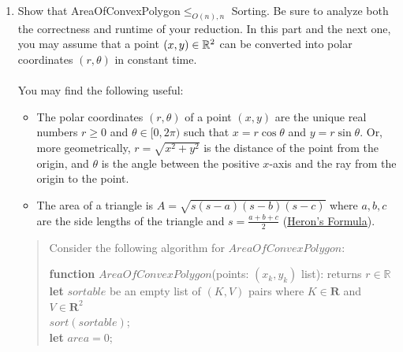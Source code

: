 \documentclass[11pt]{article}
\begin{document}
\begin{enumerate}
    \begin{enumerate}
        \item \label{part:polar} 
        Show that AreaOfConvexPolygon$\leq_{O(n),n}$ Sorting.  Be sure to analyze both the correctness and runtime of your reduction.
        In this part and the next one, you may assume that a point $(x,y)\in \mathbb{R}^2$ can be converted into polar coordinates $(r,\theta)$ in constant time. 
        \\\\
        You may find the following useful:
        \begin{itemize}
            \item The polar coordinates $(r,\theta)$ of a point $(x,y)$ are the unique real numbers $r\geq 0$ and $\theta\in [0,2\pi)$ such that $x=r\cos \theta$ and $y=r\sin \theta$. Or, more geometrically, $r=\sqrt{x^2+y^2}$ is the distance of the point from the origin, and $\theta$ is the angle between the positive $x$-axis and the ray from the origin to the point.
            \item The area of a triangle is $A = \sqrt{s(s-a)(s-b)(s-c)}$ where $a, b, c$ are the side lengths of the triangle and $s = \frac{a + b + c}{2}$ (\href{https://en.wikipedia.org/wiki/Heron\%27s_formula}{Heron's Formula}).
        \end{itemize}
        \begin{quote}
            \color{purple}
            Consider the following algorithm for $AreaOfConvexPolygon$: \newline 
           \begin{algorithm}[H]
                \textbf{function} $AreaOfConvexPolygon$(points: $(x_k, y_k)$ list): returns $r \in \mathbb{R}$\\
                {
                \textbf{let} $sortable$ be an empty list of $(K, V)$ pairs where $K \in \mathbf{R}$ and $V \in \mathbf{R}^2$ \\
                $sort(sortable)$; \\
                \textbf{let} $area = 0$; \\
                }
\end{algorithm}
\end{quote}
\end{enumerate}
\end{enumerate}
\end{document}
